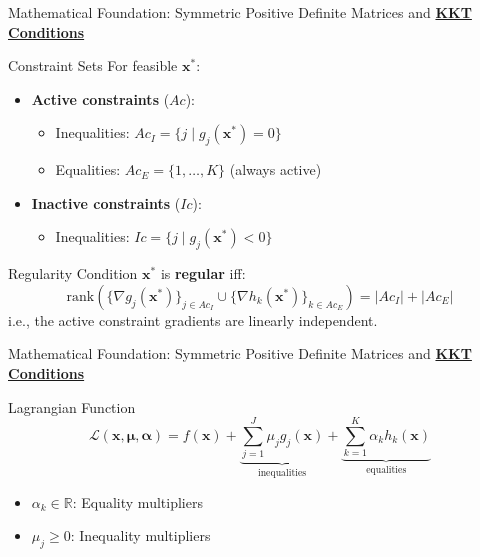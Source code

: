 \documentclass{beamer}
\begin{document}
\begin{frame}{{Mathematical Foundation: Symmetric Positive Definite Matrices and \textbf{\underline{KKT Conditions}}}}
    \begin{block}{Constraint Sets}
        For feasible $\bm{x}^*$:
        \begin{itemize}
            \item \textbf{Active constraints} ($Ac$):
                \begin{itemize}
                    \item Inequalities: $Ac_I = \{j \mid g_j(\bm{x}^*) = 0\}$
                    \item Equalities: $Ac_E = \{1,\ldots,K\}$ (always active)
                \end{itemize}

            \item \textbf{Inactive constraints} ($Ic$):
                \begin{itemize}
                    \item Inequalities: $Ic = \{j \mid g_j(\bm{x}^*) < 0\}$
                \end{itemize}
        \end{itemize}
    \end{block}

    \begin{block}{Regularity Condition}
        $\bm{x}^*$ is \textbf{regular} iff:
        \[
            \mathrm{rank}\left(\{\nabla g_j(\bm{x}^*)\}_{j \in Ac_I} \cup \{\nabla h_k(\bm{x}^*)\}_{k \in Ac_E}\right) = |Ac_I| + |Ac_E|
        \]
        i.e., the active constraint gradients are linearly independent.
    \end{block}
\end{frame}

\begin{frame}{{Mathematical Foundation: Symmetric Positive Definite Matrices and \textbf{\underline{KKT Conditions}}}}
    \begin{block}{Lagrangian Function}
        \[
            \mathcal{L}(\bm{x}, \bm{\mu}, \bm{\alpha}) = f(\bm{x}) 
            + \underbrace{\sum_{j=1}^J \mu_j g_j(\bm{x})}_{\text{inequalities}} 
            + \underbrace{\sum_{k=1}^K \alpha_k h_k(\bm{x})}_{\text{equalities}}
        \]
        \begin{itemize}
            \item $\alpha_k \in \mathbb{R}$: Equality multipliers
            \item $\mu_j \geq 0$: Inequality multipliers
        \end{itemize}
    \end{block}
\end{frame}
\end{document}
